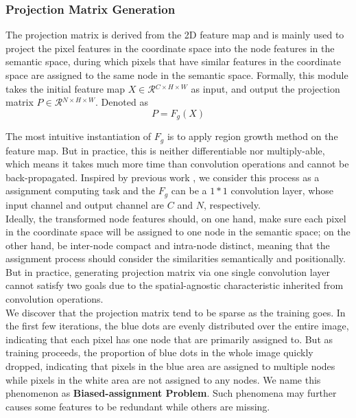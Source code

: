 \documentclass[journal]{IEEEtran}
\begin{document}
\subsubsection{Projection Matrix Generation}\label{sec_generate_proj_matrix}
   
    The projection matrix is derived from the 2D feature map and is mainly used to project the pixel features in the coordinate space into the node features in the semantic space, during which pixels that have similar features in the coordinate space are assigned to the same node in the semantic space. Formally, this module takes the initial feature map ${X}\in\mathcal{R}{^{C\times H\times W}}$ as input, and output the projection matrix ${P}\in\mathcal{R}{^{N\times H \times W}}$. Denoted as 
    \begin{equation}\label{eq_gen_proj}
    P = F_g(X)
    \end{equation}

   
    The most intuitive instantiation of $F_g$ is to apply region growth method on the feature map. But in practice, this is neither differentiable nor multiply-able, which means it takes much more time than convolution operations and cannot be back-propagated. Inspired by previous work \cite{chen2019glore}, we consider this process as a assignment computing task and the $F_g$ can be a $1*1$ convolution layer, whose input channel and output channel are $C$ and $N$, respectively. \\   

 
    Ideally, the transformed node features should, on one hand, make sure each pixel in the coordinate space will be assigned to one node in the semantic space; on the other hand, be inter-node compact and intra-node distinct, meaning that the assignment process should consider the similarities semantically and positionally. But in practice, generating projection matrix via one single convolution layer cannot satisfy two goals due to the spatial-agnostic characteristic inherited from convolution operations.\\   
    
 
    We discover that the projection matrix tend to be sparse as the training goes. In the first few iterations, the blue dots are evenly distributed over the entire image, indicating that each pixel has one node that are primarily assigned to. But as training proceeds, the proportion of blue dots in the whole image quickly dropped, indicating that pixels in the blue area are assigned to multiple nodes while pixels in the white area are not assigned to any nodes. We name this phenomenon as \textbf{Biased-assignment Problem}. Such phenomena may further causes some features to be redundant while others are missing. \\
    
\end{document}
